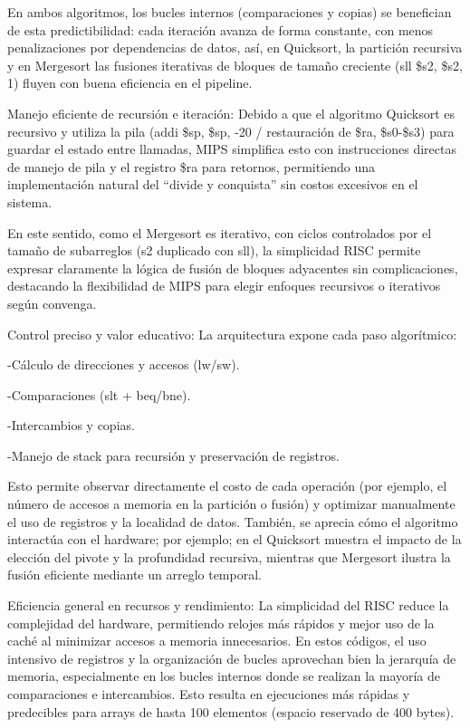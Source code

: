 \documentclass[12pt, letterpaper]{article}
\begin{document}
En ambos algoritmos, los bucles internos (comparaciones y copias) se benefician de esta predictibilidad: cada iteración avanza de forma constante, con menos penalizaciones por dependencias de datos, así, en Quicksort, la partición recursiva y en Mergesort las fusiones iterativas de bloques de tamaño creciente (sll \$s2, \$s2, 1) fluyen con buena eficiencia en el pipeline.

Manejo eficiente de recursión e iteración: Debido a que el algoritmo Quicksort es recursivo y utiliza la pila (addi \$sp, \$sp, -20 / restauración de \$ra, \$s0-\$s3) para guardar el estado entre llamadas, MIPS simplifica esto con instrucciones directas de manejo de pila y el registro \$ra para retornos, permitiendo una implementación natural del “divide y conquista” sin costos excesivos en el sistema. 

En este sentido, como el Mergesort es iterativo, con ciclos controlados por el tamaño de subarreglos (s2 duplicado con sll), la simplicidad RISC permite expresar claramente la lógica de fusión de bloques adyacentes sin complicaciones, destacando la flexibilidad de MIPS para elegir enfoques recursivos o iterativos según convenga.

Control preciso y valor educativo: La arquitectura expone cada paso algorítmico:

-Cálculo de direcciones y accesos (lw/sw).

-Comparaciones (slt + beq/bne).

-Intercambios y copias.

-Manejo de stack para recursión y preservación de registros.

Esto permite observar directamente el costo de cada operación (por ejemplo, el número de accesos a memoria en la partición o fusión) y optimizar manualmente el uso de registros y la localidad de datos. También, se aprecia cómo el algoritmo interactúa con el hardware; por ejemplo; en el Quicksort muestra el impacto de la elección del pivote y la profundidad recursiva, mientras que Mergesort ilustra la fusión eficiente mediante un arreglo temporal.

Eficiencia general en recursos y rendimiento: La simplicidad del RISC reduce la complejidad del hardware, permitiendo relojes más rápidos y mejor uso de la caché al minimizar accesos a memoria innecesarios. En estos códigos, el uso intensivo de registros y la organización de bucles aprovechan bien la jerarquía de memoria, especialmente en los bucles internos donde se realizan la mayoría de comparaciones e intercambios. Esto resulta en ejecuciones más rápidas y predecibles para arrays de hasta 100 elementos (espacio reservado de 400 bytes).
\end{document}
